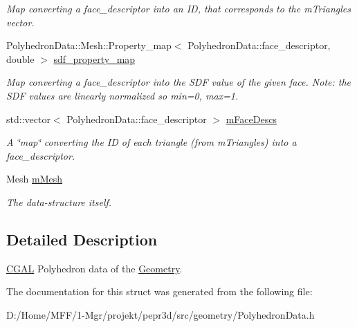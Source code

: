 \begin{DoxyCompactItemize}
\begin{DoxyCompactList}\small\item\em Map converting a face\+\_\+descriptor into an ID, that corresponds to the m\+Triangles vector. \end{DoxyCompactList}\item 
\mbox{\label{structpepr3d_1_1_polyhedron_data_a18c628197dc544d7a79b636792783c31}} 
Polyhedron\+Data\+::\+Mesh\+::\+Property\+\_\+map$<$ Polyhedron\+Data\+::face\+\_\+descriptor, double $>$ \mbox{\hyperlink{structpepr3d_1_1_polyhedron_data_a18c628197dc544d7a79b636792783c31}{sdf\+\_\+property\+\_\+map}}
\begin{DoxyCompactList}\small\item\em Map converting a face\+\_\+descriptor into the S\+DF value of the given face. Note\+: the S\+DF values are linearly normalized so min=0, max=1. \end{DoxyCompactList}\item 
\mbox{\label{structpepr3d_1_1_polyhedron_data_a405c876987a078bc168f267972b46514}} 
std\+::vector$<$ Polyhedron\+Data\+::face\+\_\+descriptor $>$ \mbox{\hyperlink{structpepr3d_1_1_polyhedron_data_a405c876987a078bc168f267972b46514}{m\+Face\+Descs}}
\begin{DoxyCompactList}\small\item\em A \char`\"{}map\char`\"{} converting the ID of each triangle (from m\+Triangles) into a face\+\_\+descriptor. \end{DoxyCompactList}\item 
\mbox{\label{structpepr3d_1_1_polyhedron_data_a27477466ca362daaf66ed853405cf959}} 
Mesh \mbox{\hyperlink{structpepr3d_1_1_polyhedron_data_a27477466ca362daaf66ed853405cf959}{m\+Mesh}}
\begin{DoxyCompactList}\small\item\em The data-\/structure itself. \end{DoxyCompactList}\end{DoxyCompactItemize}


\subsection{Detailed Description}
\mbox{\hyperlink{namespace_c_g_a_l}{C\+G\+AL}} Polyhedron data of the \mbox{\hyperlink{classpepr3d_1_1_geometry}{Geometry}}. 

The documentation for this struct was generated from the following file\+:\begin{DoxyCompactItemize}
\item 
D\+:/\+Home/\+M\+F\+F/1-\/\+Mgr/projekt/pepr3d/src/geometry/Polyhedron\+Data.\+h\end{DoxyCompactItemize}

